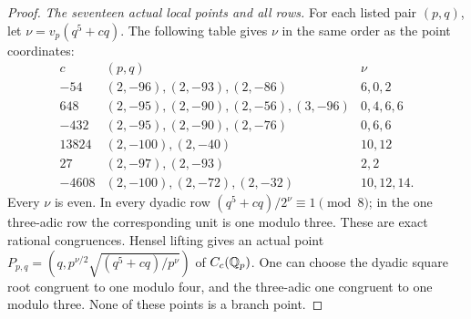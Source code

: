 \begin{proof}
\emph{The seventeen actual local points and all rows.}
For each listed pair \((p,q)\), let
\(\nu=v_p(q^5+cq)\).  The following table gives \(\nu\)
in the same order as the point coordinates:
\[
\begin{array}{r|l|l}
c&(p,q)&\nu\\ \hline
-54&(2,-96),(2,-93),(2,-86)&6,0,2\\
648&(2,-95),(2,-90),(2,-56),(3,-96)&0,4,6,6\\
-432&(2,-95),(2,-90),(2,-76)&0,6,6\\
13824&(2,-100),(2,-40)&10,12\\
27&(2,-97),(2,-93)&2,2\\
-4608&(2,-100),(2,-72),(2,-32)&10,12,14.
\end{array}
\tag{A.186.14}
\]
Every \(\nu\) is even.  In every dyadic row
\((q^5+cq)/2^\nu\equiv1\pmod8\); in the one
three-adic row the corresponding unit is one modulo three.
These are exact rational congruences.  Hensel lifting gives
an actual point
\(P_{p,q}=(q,p^{\nu/2}\sqrt{(q^5+cq)/p^\nu})\)
of \(C_c(\mathbb Q_p)\).  One can choose the dyadic square root
congruent to one modulo four, and the three-adic one
congruent to one modulo three.  None of these points is
a branch point.


\end{proof}
